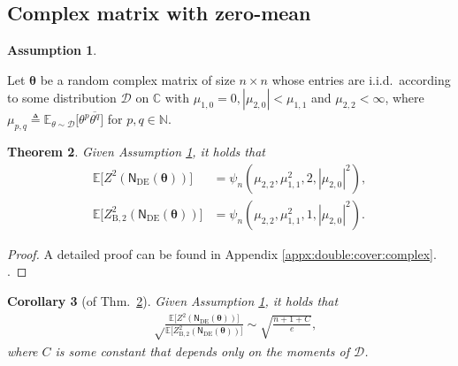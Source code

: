 \documentclass[conference]{IEEEtran}
\theoremstyle{plain}
\newtheorem{thm}{Theorem}
\newtheorem{corollary}[thm]{Corollary}
\theoremstyle{definition}
\newtheorem{assumption}[thm]{Assumption}
\providecommand{\N}{\mathbb {N}}
\providecommand{\C}{\mathbb {C}}
\newcommand{\B}{\mathrm{B}}
\newcommand{\E}{\mathbb {E}}
\newcommand{\sfn}{\mathsf{N}}
\newcommand{\btheta}{\boldsymbol{\theta}}
\newcommand{\defeq}{\triangleq}
\newcommand{\sfnDE}{\sfn_{\mathrm{DE}}}
\begin{document}

\subsection{Complex matrix with zero-mean}


\begin{assumption}
 \label{ass:iid:matrices}

 Let $\btheta$ be a random complex matrix of size $n\times n$ whose entries are
 i.i.d.~according to some distribution $\mathcal D$ on $\C$ with $\mu_{1,0}=0,
 |\mu_{2,0}|<\mu_{1,1}$ and $\mu_{2,2}<\infty$, where
 $\mu_{p,q}\defeq\E_{\theta\sim \mathcal
 D}\Big[\theta^p\overline{\theta^q}\Big]$ for $p,q\in \N$.
\end{assumption}


\begin{thm}
 \label{thm:double:cover:complex}
 Given Assumption \ref{ass:iid:matrices}, it holds that
 \begin{align*}
  \E \big[Z^2(\sfnDE(\btheta))\big]
   & = \psi_n (\mu_{2,2}, \mu_{1,1}^2, 2, |\mu_{2,0}|^2), \\
  \E \big[Z_{\B,2}^2(\sfnDE(\btheta))\big]
   & = \psi_n (\mu_{2,2}, \mu_{1,1}^2, 1, |\mu_{2,0}|^2).
 \end{align*}
\end{thm}


\begin{proof}
  A detailed proof can be found in \iflongversion Appendix
 \ref{appx:double:cover:complex}. \else \cite{zhou2026}. \fi
\end{proof}


\begin{corollary}[of
  Thm.~\ref{thm:double:cover:complex}]\label{cor:double:cover:complex}
 Given Assumption \ref{ass:iid:matrices}, it holds that
 \begin{align*}
   & \sqrt\frac{\E \big[Z^2(\sfnDE(\btheta))\big]}{\E \big[Z_{\B,2}^2(\sfnDE(\btheta))\big]}
  \sim
  \sqrt{\frac{n+1+C}{e}},
 \end{align*}
 where $C$ is some constant that depends only on the moments of $\mathcal D$.
\end{corollary}
\end{document}
